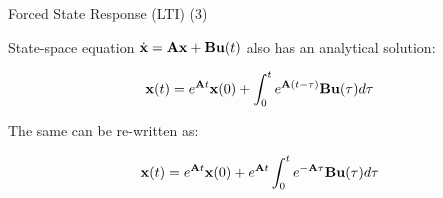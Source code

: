 \documentclass{beamer}
\begin{document}
\begin{frame}{Forced State Response (LTI) (3)}
	\begin{flushleft}
		
		State-space equation $\dot{\mathbf{x}} = \mathbf{A}  \mathbf{x} + \mathbf{B}  \mathbf{u}(t)$ also has an analytical solution:
		
		\begin{equation}
			\mathbf{x}(t) = e^{\mathbf{A}t}  \mathbf{x}(0) + 
			\int_{0}^{t} e^{\mathbf{A}(t-\tau)} \mathbf{B}  \mathbf{u}(\tau) d\tau
		\end{equation}
		
		The same can be re-written as:
		
		\begin{equation}
			\mathbf{x}(t) = e^{\mathbf{A}t}  \mathbf{x}(0) + 
			e^{\mathbf{A}t} \int_{0}^{t} e^{-\mathbf{A}\tau} \mathbf{B}  \mathbf{u}(\tau) d\tau
		\end{equation}
		
	\end{flushleft}
\end{frame}
\end{document}
